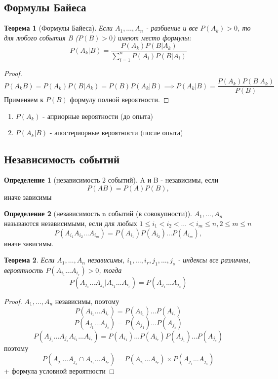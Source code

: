 \documentclass[a4paper]{article}
\newtheorem{theorem}{Теорема}[section]
\theoremstyle{definition}
\newtheorem*{definition}{Определение}
\theoremstyle{remark}
\begin{document}
\subsection{Формулы Байеса}
\begin{theorem}[Формулы Байеса]
    Если $A_1, \dots, A_n$ - разбиение и все $P(A_k)>0$, то для любого события B ($P(B)> 0$) имеют место формулы:
    \[P(A_k | B) = \frac{P(A_k)P(B | A_k)}{\sum_{i=1}^{n}P(A_i)P(B|A_i)}\]
\end{theorem}
\begin{proof}
    \[P(A_k B) = P(A_k) P (B | A_k) = P(B) P(A_k | B) \implies P (A_k | B) = \frac{P(A_k)P(B|A_k)}{P(B)}\]
    Применяем к $P(B)$ формулу полной вероятности.
\end{proof}
\begin{enumerate}
    \item $P(A_k)$ - априорные вероятности (до опыта)
    \item $P(A_k | B)$ - апостериорные вероятности (после опыта)
\end{enumerate}
\subsection{Независимость событий}
\begin{definition}[независимость 2 событий]
    A и B - независимы, если \[P(AB) = P(A)P(B),\]иначе зависимы
\end{definition}
\begin{definition}[независимость n событий (в совокупности)]
    $A_1, \dots, A_n$ называются независимыми, если для любых $1 \le i_1 < i_2 < \dots < i_m \le n, 2 \le m \le n$
    \[P(A_{i_1}A_{i_2}\dots A_{i_m}) = P(A_{i_1})P(A_{i_2})\dots  P(A_{i_m}),\] иначе зависимы.
\end{definition}
\begin{theorem}
    Если $A_1, \dots, A_n$ независимы, $i_1, \dots, i_r, j_1, \dots, j_s$ - индексы все различны, вероятность $P(A_{i_1}\dots A_{i_r}) > 0$, тогда
    \[P(A_{j_1}\dots A_{j_s}| A_{i_1}\dots A_{i_r}) = P(A_{j_1}\dots A_{j_s})\]
\end{theorem}
\begin{proof}
    $A_1, \dots, A_n$ независимы, поэтому
    \[P (A_{i_1}\dots A_{i_r}) = P(A_{i_1})\dots P(A_{i_r})\]
    \[P (A_{j_1}\dots A_{j_s}) = P(A_{j_1})\dots P(A_{j_s})\]
    \[P(A_{j_1}\dots A_{j_s} A_{i_1}\dots A_{i_r}) = P(A_{i_1})\dots P(A_{i_r}) P(A_{j_1})\dots P(A_{j_s})\]
    поэтому \[P(A_{j_1}\dots A_{j_s} \cap A_{i_1}\dots A_{i_r}) = P(A_{i_1}\dots A_{i_r})\times P(A_{j_1}\dots A_{j_s}) \]
    + формула условной вероятности
\end{proof}
\end{document}
